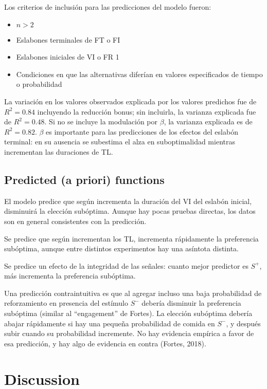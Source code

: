 \documentclass[a4paper,12pt]{article}
\begin{document}
Los criterios de inclusión para las predicciones del modelo fueron:
\begin{itemize}
    \item $n > 2$ 
    \item Eslabones terminales de FT o FI
    \item Eslabones iniciales de VI o FR 1
    \item Condiciones en que las alternativas diferían en valores especificados de tiempo o probabilidad
\end{itemize}

La variación en los valores observados explicada por los valores predichos fue de ${R^{2} = 0.84}$ incluyendo la reducción bonus; sin incluirla, la varianza explicada fue de $R^{2} = 0.48$.
Si no se incluye la modulación por $\beta$, la varianza explicada es de $R^{2} = 0.82$.
$\beta$ es importante para las predicciones de los efectos del eslabón terminal: en su ausencia se subestima el alza en suboptimalidad mientras incrementan las duraciones de TL.

\subsection{Predicted (a priori) functions}

El modelo predice que según incrementa la duración del VI del eslabón inicial, disminuirá la elección subóptima.
Aunque hay pocas pruebas directas, los datos son en general consistentes con la predicción.

Se predice que según incrementan los TL, incrementa rápidamente la preferencia subóptima, aunque entre distintos experimentos hay una asíntota distinta.

Se predice un efecto de la integridad de las señales: cuanto mejor predictor es $S^{+}$, más incrementa la preferencia subóptima.

Una predicción contraintuitiva es que al agregar incluso una baja probabilidad de reforzamiento en presencia del estímulo $S^{-}$ debería disminuir la preferencia subóptima (similar al ``engagement'' de Fortes).
La elección subóptima debería abajar rápidamente si hay una pequeña probabilidad de comida en $S^{-}$, y después subir cuando su probabilidad incremente.
No hay evidencia empírica a favor de esa predicción, y hay algo de evidencia en contra (Fortes, 2018).

\section{Discussion}
\end{document}
